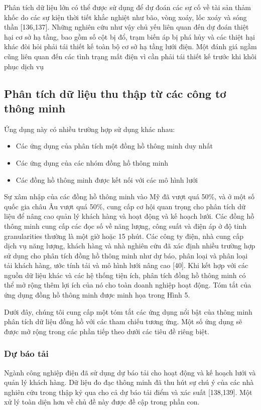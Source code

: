 \documentclass[utf8]{frontiersSCNS} %
\begin{document}
Phân tích dữ liệu lớn có thể được sử dụng để dự đoán các sự cố về tài sản thảm khốc do các sự kiện thời tiết khắc nghiệt như bão, vòng xoáy, lốc xoáy và sóng thần [136,137]. Những nghiên cứu như vậy chủ yếu liên quan đến dự đoán thiệt hại cơ sở hạ tầng, bao gồm số cột bị đổ, trạm biến áp bị phá hủy và các thiệt hại khác đòi hỏi phải tái thiết kế toàn bộ cơ sở hạ tầng lưới điện. Một đánh giá ngầm cũng liên quan đến các tình trạng mất điện vì cần phải tái thiết kế trước khi khôi phục dịch vụ


\subsection{Phân tích dữ liệu thu thập từ các công tơ thông minh}

Ứng dụng này có nhiều trường hợp sử dụng khác nhau:

\begin{itemize}
\item Các ứng dụng của phân tích một đồng hồ thông minh duy nhất
\item Các ứng dụng của các nhóm đồng hồ thông minh
\item Các đồng hồ thông minh được kết nối với các mô hình lưới
\end{itemize}

Sự xâm nhập của các đồng hồ thông minh vào Mỹ đã vượt quá 50\%, và ở một số quốc gia châu Âu vượt quá 50\%, cung cấp cơ hội quan trọng cho phân tích dữ liệu để nâng cao quản lý khách hàng và hoạt động và kế hoạch lưới. Các đồng hồ thông minh cung cấp các đọc số về năng lượng, công suất và điện áp ở độ tinh granularities thường là một giờ hoặc 15 phút. Các công ty điện, nhà cung cấp dịch vụ năng lượng, khách hàng và nhà nghiên cứu đã xác định nhiều trường hợp sử dụng cho phân tích đồng hồ thông minh như dự báo, phân loại và phân loại tải khách hàng, ước tính tải và mô hình lưới nâng cao [40]. Khi kết hợp với các nguồn dữ liệu khác và các hệ thống tiện ích, phân tích đồng hồ thông minh có thể mở rộng thêm lợi ích của nó cho toàn doanh nghiệp hoạt động. Tóm tắt của ứng dụng đồng hồ thông minh được minh họa trong Hình 5.

Dưới đây, chúng tôi cung cấp một tóm tắt các ứng dụng nổi bật của thông minh phân tích dữ liệu đồng hồ với các tham chiếu tương ứng. Một số ứng dụng sẽ được mở rộng trong các phần tiếp theo dưới các tiêu đề riêng biệt.

\subsubsection{Dự báo tải}
Ngành công nghiệp điện đã sử dụng dự báo tải cho hoạt động và kế hoạch lưới và quản lý khách hàng. Dữ liệu đo đạc thông minh đã thu hút sự chú ý của các nhà nghiên cứu trong thập kỷ qua cho cả dự báo tải điểm và xác suất [138,139]. Một xử lý toàn diện hơn về chủ đề này được đề cập trong phần con.
\end{document}
